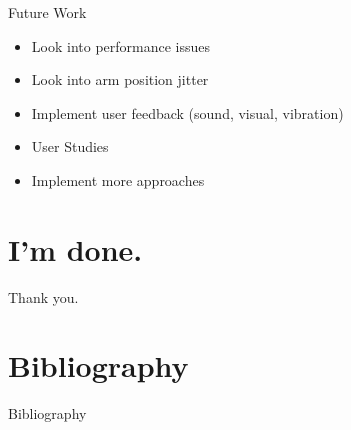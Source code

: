 \documentclass[t]{beamer}
\begin{document}
\begin{frame}{Future Work}
\begin{itemize}
	\item Look into performance issues
	\item Look into arm position jitter
	\item Implement user feedback (sound, visual, vibration)
	\item User Studies
\end{itemize}

\begin{itemize}
	\item Implement more approaches
\end{itemize}
\end{frame}

\section*{I'm done.}

\begin{frame}[c]
\centering
Thank you.
\end{frame}


\section{Bibliography}

\begin{frame}[allowframebreaks]{Bibliography}
\printbibliography
\end{frame}
\end{document}
